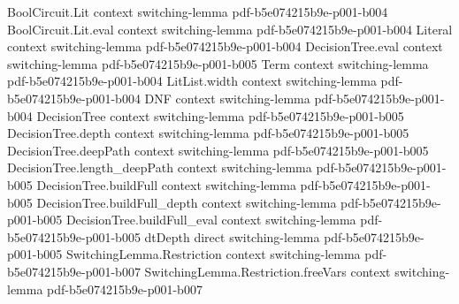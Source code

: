 \begin{theorem}
\label{LMN.one_step_dtDepth_bound}
\leanok
{}
\proofstep
  {BoolCircuit.Lit}
  {context}
  {switching-lemma}
  {pdf-b5e074215b9e-p001-b004}
\proofstep
  {BoolCircuit.Lit.eval}
  {context}
  {switching-lemma}
  {pdf-b5e074215b9e-p001-b004}
\proofstep
  {Literal}
  {context}
  {switching-lemma}
  {pdf-b5e074215b9e-p001-b004}
\proofstep
  {DecisionTree.eval}
  {context}
  {switching-lemma}
  {pdf-b5e074215b9e-p001-b005}
\proofstep
  {Term}
  {context}
  {switching-lemma}
  {pdf-b5e074215b9e-p001-b004}
\proofstep
  {LitList.width}
  {context}
  {switching-lemma}
  {pdf-b5e074215b9e-p001-b004}
\proofstep
  {DNF}
  {context}
  {switching-lemma}
  {pdf-b5e074215b9e-p001-b004}
\proofstep
  {DecisionTree}
  {context}
  {switching-lemma}
  {pdf-b5e074215b9e-p001-b005}
\proofstep
  {DecisionTree.depth}
  {context}
  {switching-lemma}
  {pdf-b5e074215b9e-p001-b005}
\proofstep
  {DecisionTree.deepPath}
  {context}
  {switching-lemma}
  {pdf-b5e074215b9e-p001-b005}
\proofstep
  {DecisionTree.length_deepPath}
  {context}
  {switching-lemma}
  {pdf-b5e074215b9e-p001-b005}
\proofstep
  {DecisionTree.buildFull}
  {context}
  {switching-lemma}
  {pdf-b5e074215b9e-p001-b005}
\proofstep
  {DecisionTree.buildFull_depth}
  {context}
  {switching-lemma}
  {pdf-b5e074215b9e-p001-b005}
\proofstep
  {DecisionTree.buildFull_eval}
  {context}
  {switching-lemma}
  {pdf-b5e074215b9e-p001-b005}
\proofstep
  {dtDepth}
  {direct}
  {switching-lemma}
  {pdf-b5e074215b9e-p001-b005}
\proofstep
  {SwitchingLemma.Restriction}
  {context}
  {switching-lemma}
  {pdf-b5e074215b9e-p001-b007}
\proofstep
  {SwitchingLemma.Restriction.freeVars}
  {context}
  {switching-lemma}
  {pdf-b5e074215b9e-p001-b007}

\end{theorem}

